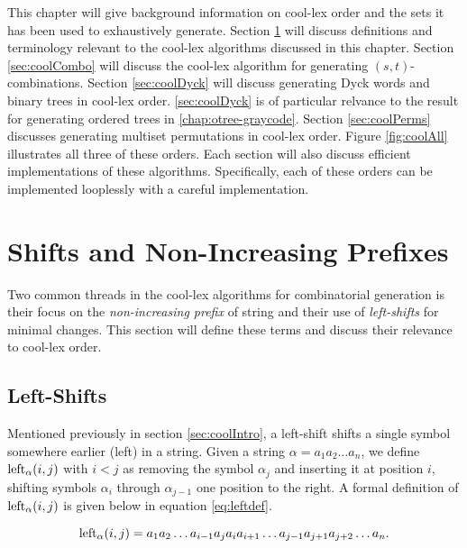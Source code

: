 This chapter will give background information on cool-lex order and the sets it has been used to exhaustively generate.  Section \ref{sec:shiftsandprefixes} will discuss definitions and terminology relevant to the cool-lex algorithms discussed in this chapter.  Section \ref{sec:coolCombo} will discuss the cool-lex algorithm for generating $(s,t)$-combinations.  Section \ref{sec:coolDyck} will discuss generating Dyck words and binary trees in cool-lex order.  \ref{sec:coolDyck} is of particular relvance to the result for generating ordered trees in \ref{chap:otree-graycode}.  Section \ref{sec:coolPerms} discusses generating multiset permutations in cool-lex order.  Figure \ref{fig:coolAll} illustrates all three of these orders. Each section will also discuss efficient implementations of these algorithms.  Specifically, each of these orders can be implemented looplessly with a careful implementation.


\section{Shifts and Non-Increasing Prefixes} \label{sec:shiftsandprefixes}
Two common threads in the cool-lex algorithms for combinatorial generation is their focus on the \emph{non-increasing prefix} of string and their use of \emph{left-shifts} for minimal changes.  This section will define these terms and discuss their relevance to cool-lex order.

\subsection{Left-Shifts}
  Mentioned previously in section \ref{sec:coolIntro}, a left-shift shifts a single symbol somewhere earlier (left) in a string.  Given a string $\alpha = a_1 a_2 \ldots a_n$, we define $\lshiftindex[\alpha]{i}{j}$ with $i < j$ as removing the symbol $\alpha_j$ and inserting it at position $i$, shifting symbols $\alpha_i$ through $\alpha_{j-1}$ one position to the right.  A formal definition of $\lshiftindex[\alpha]{i}{j}$ is given below in equation \ref{eq:leftdef}.

\begin{equation} \label{eq:leftdef}
    \lshiftindex[\alpha]{i}{j} = a_1 a_2 \ldots a_{i-1} a_j a_{i} a_{i+1} \ldots a_{j-1} a_{j+1} a_{j+2} \ldots a_n.
\end{equation}


